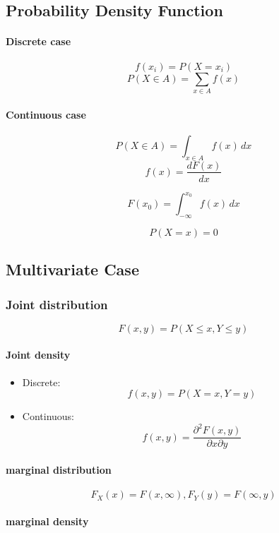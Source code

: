 \subsection{Probability Density Function}

\paragraph{Discrete case}
\[
f(x_i) = P(X = x_i)
\]
\[
P(X \in A) = \sum_{x \in A} f(x)
\]

\paragraph{Continuous case}
\[
P(X \in A) = \int_{x \in A} f(x)\,dx
\]
\[
f(x) = \frac{dF(x)}{dx}
\]

\[
F(x_0) = \int_{-\infty}^{x_0} f(x)\,dx
\]

\[
P(X = x) = 0
\]

\subsection{Multivariate Case}

\subsubsection*{Joint distribution}

\[
F(x,y) = P(X \le x, Y \le y)
\]

\paragraph{Joint density}

\begin{itemize}
    \item Discrete:
    \[
    f(x,y) = P(X=x, Y=y)
    \]

    \item Continuous:
    \[
    f(x,y) = \frac{\partial^2 F(x,y)}{\partial x \partial y}
    \]
\end{itemize}

\paragraph{marginal distribution}

\[
F_X(x) = F(x,\infty), F_Y(y) = F(\infty,y)
\]

\paragraph{marginal density}


